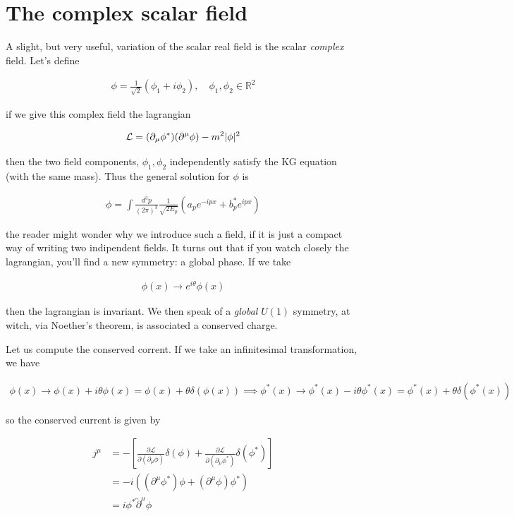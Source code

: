 \documentclass{report}
\begin{document}
\section{The complex scalar field}

A slight, but very useful, variation of the scalar real field is the scalar \emph{complex} field. Let's define 

\begin{align}
    \phi = \frac{1}{\sqrt{2}}(\phi_1 + i\phi_2), \quad \phi_1, \phi_2 \in \mathbb{R}^2
\end{align}

if we give this complex field the lagrangian

\begin{align}
    \mathcal{L} = (\partial_\mu \phi^*)(\partial^\mu \phi) - m^2 \lvert\phi\rvert^2
\end{align}

then the two field components, \(\phi_1, \phi_2\) independently satisfy the KG equation (with the same mass). Thus the general solution for \(\phi\) is 

\begin{align}
    \phi = \int \frac{d^3p}{(2\pi)^3}\frac{1}{\sqrt{2E_p}}(a_p e^{-ipx} + b^*_p e^{ipx})
\end{align}

the reader might wonder why we introduce such a field, if it is just a compact way of writing two indipendent fields. It turns out that if you watch closely the lagrangian, you'll find a new symmetry: a global phase. If we take 

\begin{align}
    \phi(x) \rightarrow e^{i\theta}\phi(x)
\end{align}

then the lagrangian is invariant. We then speak of a \emph{global} \(U(1)\) symmetry, at witch, via Noether's theorem, is associated a conserved charge. 

Let us compute the conserved corrent. If we take an infinitesimal transformation, we have 

\begin{align}
    \phi(x) \rightarrow \phi(x) + i\theta\phi(x) = \phi(x) + \theta\delta(\phi(x)) \implies \phi^*(x) \rightarrow \phi^*(x) - i\theta\phi^*(x) = \phi^*(x) + \theta\delta(\phi^*(x))
\end{align}

so the conserved current is given by 

\begin{align}
    j^\mu &= -\left[\frac{\partial \mathcal L}{\partial(\partial_\mu\phi)}\delta(\phi) + \frac{\partial \mathcal L}{\partial(\partial_\mu\phi^*)}\delta(\phi^*) \right] \\
    &= -i((\partial^\mu\phi^*)\phi + (\partial^\mu\phi)\phi^*) \\
    &= i\phi^*\overleftrightarrow{\partial}^\mu \phi
\end{align}
\end{document}
